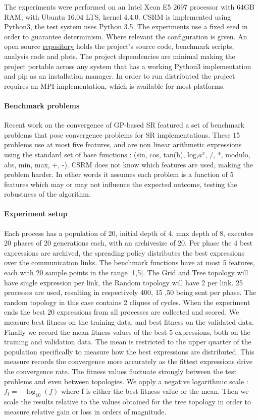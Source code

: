 The experiments were performed on an Intel Xeon E5 2697 processor with 64GB RAM, with Ubuntu 16.04 LTS, kernel 4.4.0.
CSRM is implemented using Python3, the test system uses Python 3.5. 
The experiments use a fixed seed in order to guarantee determinism. Where relevant the configuration is given. 
An open source \href{https://bitbucket.org/bcardoen/csrm}{repository} holds the project's source code, benchmark scripts, analysis code and plots. The project dependencies are minimal making the project portable across any system that has a working Python3 implementation and pip as an installation manager. In order to run distributed the project requires an MPI implementation, which is available for most platforms.
\paragraph{Benchmark problems}
Recent work on the convergence of GP-based SR \cite{SRAccur, SRBaseline} featured a set of benchmark problems that pose convergence problems for SR implementations. 
These 15 problems use at most five features, and are non linear arithmetic expressions using the standard set of base functions : (sin, cos, tan(h), log,$a^x$, /, *, modulo, abs, min, max, +, -). CSRM does not know which features are used, making the problem harder. In other words it assumes each problem is a function of 5 features which may or may not influence the expected outcome, testing the robustness of the algorithm.
\paragraph{Experiment setup}
Each process has a population of 20, initial depth of 4, max depth of 8, executes 20 phases of 20 generations each, with an archivesize of 20. Per phase the 4 best expressions are archived, the spreading policy distributes the best expressions over the communication links. The benchmark functions have at most 5 features, each with 20 sample points in the range [1,5]. The Grid and Tree topology will have single expression per link, the Random topology will have 2 per link. 25 processes are used, resulting in respectively 400, 15 ,50 being sent per phase. The random topology in this case contains 2 cliques of cycles.
When the experiment ends the best 20 expressions from all processes are collected and scored. We measure best fitness on the training data, and best fitness on the validated data. 
Finally we record the mean fitness values of the best 5 expressions, both on the training and validation data. The mean is restricted to the upper quarter of the population specifically to measure how the best expressions are distributed. This measure records the convergence more accurately as the fittest expressions drive the convergence rate. 
The fitness values fluctuate strongly between the test problems and even between topologies. We apply a negative logarithmic scale :
$
f_t = -\log_{10}(f)
$
where f is either the best fitness value or the mean. Then we scale the results relative to the values obtained for the tree topology in order to measure relative gain or loss in orders of magnitude.
